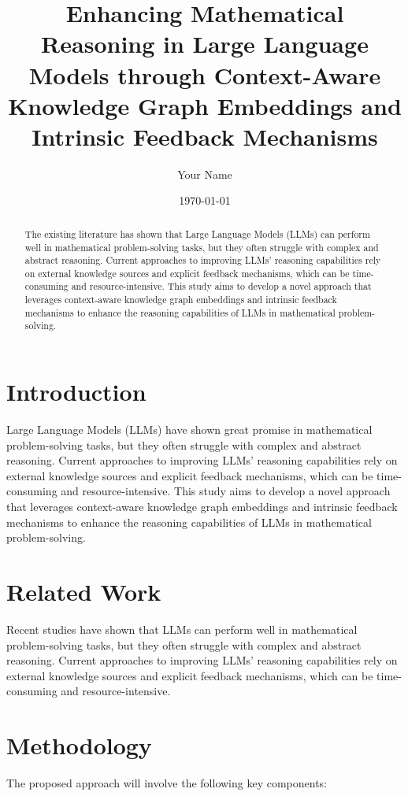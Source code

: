 \documentclass{article}
\title{Enhancing Mathematical Reasoning in Large Language Models through Context-Aware Knowledge Graph Embeddings and Intrinsic Feedback Mechanisms}
\author{Your Name}
\date{\today}
\begin{document}
\maketitle

\begin{abstract}
The existing literature has shown that Large Language Models (LLMs) can perform well in mathematical problem-solving tasks, but they often struggle with complex and abstract reasoning. Current approaches to improving LLMs' reasoning capabilities rely on external knowledge sources and explicit feedback mechanisms, which can be time-consuming and resource-intensive. This study aims to develop a novel approach that leverages context-aware knowledge graph embeddings and intrinsic feedback mechanisms to enhance the reasoning capabilities of LLMs in mathematical problem-solving.
\end{abstract}

\section{Introduction}

Large Language Models (LLMs) have shown great promise in mathematical problem-solving tasks, but they often struggle with complex and abstract reasoning. Current approaches to improving LLMs' reasoning capabilities rely on external knowledge sources and explicit feedback mechanisms, which can be time-consuming and resource-intensive. This study aims to develop a novel approach that leverages context-aware knowledge graph embeddings and intrinsic feedback mechanisms to enhance the reasoning capabilities of LLMs in mathematical problem-solving.

\section{Related Work}

Recent studies have shown that LLMs can perform well in mathematical problem-solving tasks, but they often struggle with complex and abstract reasoning. Current approaches to improving LLMs' reasoning capabilities rely on external knowledge sources and explicit feedback mechanisms, which can be time-consuming and resource-intensive.

\section{Methodology}

The proposed approach will involve the following key components:
\end{document}
